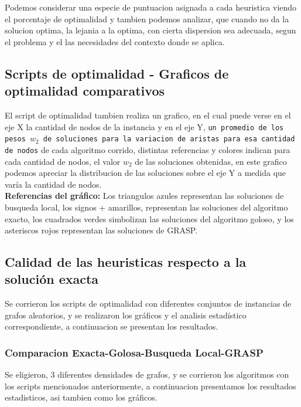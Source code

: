 Podemos considerar una especie de puntuacion asignada a cada heuristica viendo el porcentaje de optimalidad y tambien podemos analizar, que cuando no da la solucion optima, la lejania a la optima, con cierta dispersion sea adecuada, segun el problema y el las necesidades del contexto donde se aplica.

\subsection{Scripts de optimalidad - Graficos de optimalidad comparativos}
El script de optimalidad tambien realiza un grafico, en el cual puede verse en el eje X la cantidad de nodos de la instancia y en el eje Y, \texttt{un promedio de los pesos $w_2$ de soluciones para la variacion de aristas para esa cantidad de nodos} de cada algoritmo corrido, distintas referencias y colores indican para cada cantidad de nodos, el valor $w_2$ de las soluciones obtenidas, en este grafico podemos apreciar la distribucion de las soluciones sobre el eje Y a medida que var\'ia la cantidad de nodos.\\
\textbf{Referencias del gr\'afico: } Los triangulos azules representan las soluciones de busqueda local, los signos + amarillos, representan las soluciones del algoritmo exacto, los cuadrados verdes simbolizan las soluciones del algoritmo goloso, y los asteriscos rojos representan las soluciones de GRASP.

\subsection{Calidad de las heuristicas respecto a la soluci\'on exacta}
Se corrieron los scripts de optimalidad con diferentes conjuntos de instancias de grafos aleatorios, y se realizaron los gr\'aficos y el analisis estad\'istico correspondiente, a continuacion se presentan los resultados.
\subsubsection{Comparacion Exacta-Golosa-Busqueda Local-GRASP}
Se eligieron, 3 diferentes densidades de grafos, y se corrieron los algoritmos con los scripts mencionados anteriormente, a continuacion presentamos los resultados estadisticos, asi tambien como los gr\'aficos.


